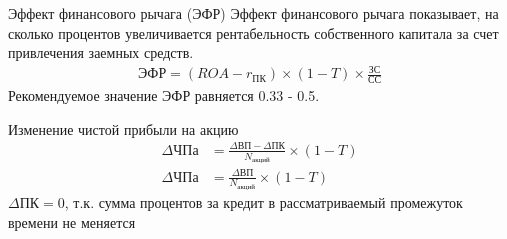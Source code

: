 \documentclass[financial_risks_lectures.tex]{subfiles}
\begin{document}
\begin{frame}{Эффект финансового рычага (ЭФР)}
Эффект финансового рычага показывает, на сколько процентов увеличивается рентабельность собственного капитала за счет привлечения заемных средств. 
\begin{align}
\label{degree_of_financial_leverage2}
\text{ЭФР}=(ROA-r_{\text{ПК}}) \times (1-T)\times \frac{\text{ЗС}}{\text{СС}}
\end{align}
Рекомендуемое значение ЭФР равняется 0.33 - 0.5.
\end{frame}

\begin{frame}{Изменение чистой прибыли на акцию}
\begin{align}
\Delta\text{ЧПа} &= \frac{\Delta\text{ВП} - \Delta\text{ПК}}{N_{\text{акций}}}\times (1 - T)\\
\Delta\text{ЧПа} &= \frac{\Delta\text{ВП}}{N_{\text{акций}}}\times (1 - T)
\end{align}
$\Delta\text{ПК}=0$, т.к. сумма процентов за кредит в рассматриваемый промежуток времени не меняется
\end{frame}
\end{document}
